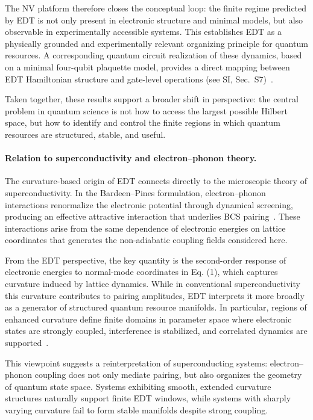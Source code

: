\documentclass[twocolumn,10pt]{article}
\begin{document}
The NV platform therefore closes the conceptual loop: the finite regime predicted by EDT is not only present in electronic structure and minimal models, but also observable in experimentally accessible systems. This establishes EDT as a physically grounded and experimentally relevant organizing principle for quantum resources. A corresponding quantum circuit realization of these dynamics, based on a minimal four-qubit plaquette model, provides a direct mapping between EDT Hamiltonian structure and gate-level operations (see SI, Sec.~S7)~\cite{Lloyd1996,Childs2019}.

Taken together, these results support a broader shift in perspective: the central problem in quantum science is not how to access the largest possible Hilbert space, but how to identify and control the finite regions in which quantum resources are structured, stable, and useful.

\paragraph*{Relation to superconductivity and electron--phonon theory.}

The curvature-based origin of EDT connects directly to the microscopic theory of superconductivity. In the Bardeen--Pines formulation, electron--phonon interactions renormalize the electronic potential through dynamical screening, producing an effective attractive interaction that underlies BCS pairing~\cite{BardeenPines1955,BCS1957}. These interactions arise from the same dependence of electronic energies on lattice coordinates that generates the non-adiabatic coupling fields considered here.

From the EDT perspective, the key quantity is the second-order response of electronic energies to normal-mode coordinates in Eq. (1), which captures curvature induced by lattice dynamics. While in conventional superconductivity this curvature contributes to pairing amplitudes, EDT interprets it more broadly as a generator of structured quantum resource manifolds. In particular, regions of enhanced curvature define finite domains in parameter space where electronic states are strongly coupled, interference is stabilized, and correlated dynamics are supported~\cite{Giustino2017}.

This viewpoint suggests a reinterpretation of superconducting systems: electron--phonon coupling does not only mediate pairing, but also organizes the geometry of quantum state space. Systems exhibiting smooth, extended curvature structures naturally support finite EDT windows, while systems with sharply varying curvature fail to form stable manifolds despite strong coupling.
\end{document}
